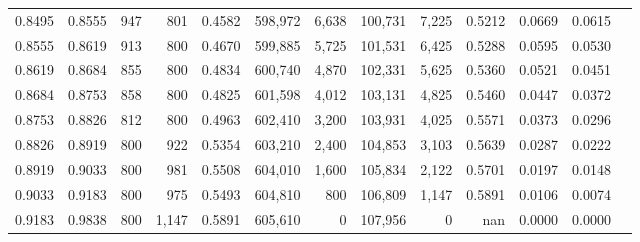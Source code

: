 \begin{tabular}{rrrrrrrrrrrrr}
0.8495 & 0.8555 &    947 &   801 &                                     0.4582 & 598,972 &   6,638 & 100,731 &   7,225 & 0.5212 & 0.0669 & 0.0615 \\
0.8555 & 0.8619 &    913 &   800 &                                     0.4670 & 599,885 &   5,725 & 101,531 &   6,425 & 0.5288 & 0.0595 & 0.0530 \\
0.8619 & 0.8684 &    855 &   800 &                                     0.4834 & 600,740 &   4,870 & 102,331 &   5,625 & 0.5360 & 0.0521 & 0.0451 \\
0.8684 & 0.8753 &    858 &   800 &                                     0.4825 & 601,598 &   4,012 & 103,131 &   4,825 & 0.5460 & 0.0447 & 0.0372 \\
0.8753 & 0.8826 &    812 &   800 &                                     0.4963 & 602,410 &   3,200 & 103,931 &   4,025 & 0.5571 & 0.0373 & 0.0296 \\
0.8826 & 0.8919 &    800 &   922 &                                     0.5354 & 603,210 &   2,400 & 104,853 &   3,103 & 0.5639 & 0.0287 & 0.0222 \\
0.8919 & 0.9033 &    800 &   981 &                                     0.5508 & 604,010 &   1,600 & 105,834 &   2,122 & 0.5701 & 0.0197 & 0.0148 \\
0.9033 & 0.9183 &    800 &   975 &                                     0.5493 & 604,810 &     800 & 106,809 &   1,147 & 0.5891 & 0.0106 & 0.0074 \\
0.9183 & 0.9838 &    800 & 1,147 &                                     0.5891 & 605,610 &       0 & 107,956 &       0 &    nan & 0.0000 & 0.0000 \\
\bottomrule
\end{tabular}
